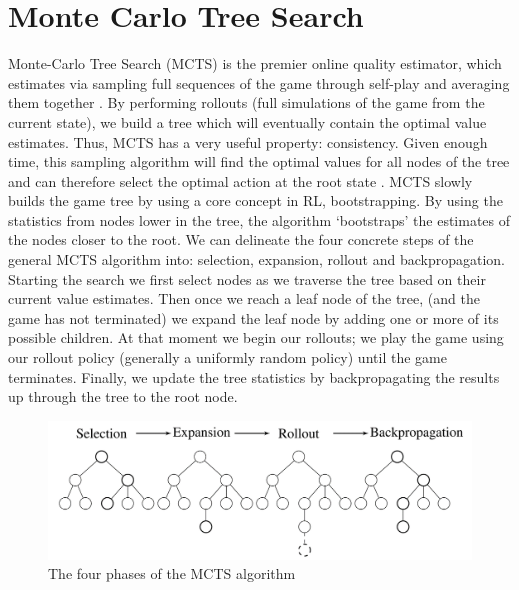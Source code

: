 \documentclass[msc, ai, twoside, notimes, logo, parskip, leftchapter, normalheadings]{infthesis}
\begin{document}
\section{Monte Carlo Tree Search}
Monte-Carlo Tree Search (MCTS) is the premier online quality estimator, which estimates via sampling full sequences of the game through self-play and averaging them together \citep{Gelly}. By performing rollouts (full simulations of the game from the current state), we build a tree which will eventually contain the optimal value estimates. Thus, MCTS has a very useful property: consistency. Given enough time, this sampling algorithm will find the optimal values for all nodes of the tree and can therefore select the optimal action at the root state \citep{Gelly}. MCTS slowly builds the game tree by using a core concept in RL, bootstrapping. By using the statistics from nodes lower in the tree, the algorithm `bootstraps' the estimates of the nodes closer to the root. We can delineate the four concrete steps of the general MCTS algorithm into: selection, expansion, rollout and backpropagation. Starting the search we first select nodes as we traverse the tree based on their current value estimates. Then once we reach a leaf node of the tree, (and the game has not terminated) we expand the leaf node by adding one or more of its possible children. At that moment we begin our rollouts; we play the game using our rollout policy (generally a uniformly random policy) until the game terminates. Finally, we update the tree statistics by backpropagating the results up through the tree to the root node. 

\begin{figure}[h]
\caption{The four phases of the MCTS algorithm}
\centering
\includegraphics[scale=.825]{figures/MCTS}
\end{figure}
\end{document}
